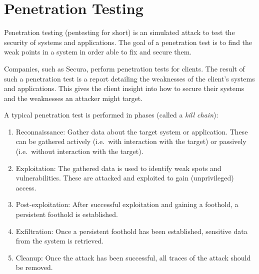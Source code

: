 \section{Penetration Testing}
Penetration testing (pentesting for short) is an simulated attack to test the security of systems and applications. The goal of a penetration test is to find the weak points in a system in order able to fix and secure them.

Companies, such as Secura, perform penetration tests for clients. The result of such a penetration test is a report detailing the weaknesses of the client's systems and applications. This gives the client insight into how to secure their systems and the weaknesses an attacker might target.

A typical penetration test is performed in phases (called a \emph{kill chain}):
\begin{enumerate}
    \item Reconnaissance: Gather data about the target system or application. These can be gathered actively (i.e.\ with interaction with the target) or passively (i.e.\ without interaction with the target).
    \item Exploitation: The gathered data is used to identify weak spots and vulnerabilities. These are attacked and exploited to gain (unprivileged) access.
    \item Post-exploitation: After successful exploitation and gaining a foothold, a persistent foothold is established.
    \item Exfiltration: Once a persistent foothold has been established, sensitive data from the system is retrieved.
    \item Cleanup: Once the attack has been successful, all traces of the attack should be removed.
\end{enumerate}

\medskip

